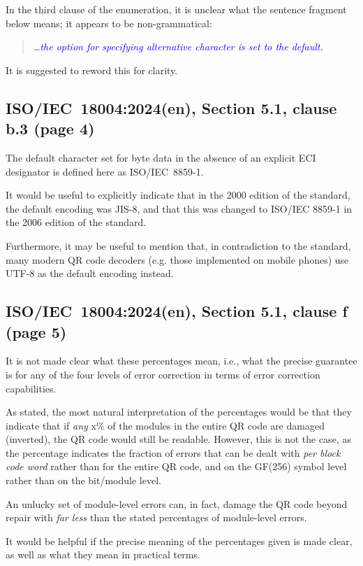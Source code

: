 \documentclass[a4paper,twoside]{article}
\newcommand{\shortstandard}{ISO/IEC~18004}
\newcommand{\standard}{\shortstandard:2024(en)}
\newcommand{\quotestandard}[1]{\textcolor{blue}{\textit{#1}}}
\newcommand{\ddd}{\dots}
\begin{document}
In the third clause of the enumeration, it is unclear what the sentence fragment below means; it appears to be non-grammatical:

\begin{quote}
\quotestandard{\ddd the option for specifying alternative character is set to the default.}
\end{quote}

It is suggested to reword this for clarity.

\subsection{\standard, Section 5.1, clause b.3 (page 4)}

The default character set for byte data in the absence of an explicit ECI designator is defined here as ISO/IEC~8859-1.

It would be useful to explicitly indicate that in the 2000 edition of the standard, the default encoding was JIS-8,
and that this was changed to ISO/IEC 8859-1 in the 2006 edition of the standard.

Furthermore, it may be useful to mention that, in contradiction to the standard, many modern QR code decoders (e.g. those
implemented on mobile phones) use UTF-8 as the default encoding instead.

\subsection{\standard, Section 5.1, clause f (page 5)}

It is not made clear what these percentages mean, i.e., what the precise guarantee is for any of the four levels of
error correction in terms of error correction capabilities.

As stated, the most natural interpretation of the percentages would be that they indicate that if \emph{any} x\% of the
modules in the entire QR code are damaged (inverted), the QR code would still be readable. However, this is not the
case, as the percentage indicates the fraction of errors that can be dealt with \emph{per block code word} rather than for
the entire QR code, and on the GF(256) symbol level rather than on the bit/module level.

An unlucky set of module-level errors can, in fact, damage the QR code beyond repair with \emph{far less} than the stated
percentages of module-level errors.

It would be helpful if the precise meaning of the percentages given is made clear, as well as what they mean in practical
terms.
\end{document}
